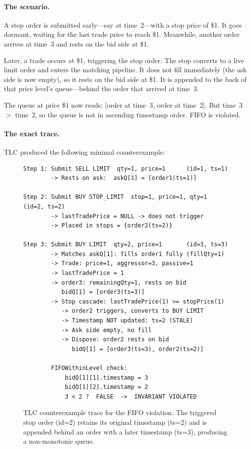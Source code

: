 \documentclass[11pt,a4paper]{article}
\begin{document}
\paragraph{The scenario.} A stop order is submitted early---say at
time~2---with a stop price of \$1. It goes dormant, waiting for the
last trade price to reach \$1. Meanwhile, another order arrives at
time~3 and rests on the bid side at \$1.

Later, a trade occurs at \$1, triggering the stop order. The stop
converts to a live limit order and enters the matching pipeline. It
does not fill immediately (the ask side is now empty), so it rests on
the bid side at \$1. It is appended to the back of that price level's
queue---behind the order that arrived at time~3.

The queue at price \$1 now reads: [order at time~3, order at time~2].
But time~3 $>$ time~2, so the queue is not in ascending timestamp order.
FIFO is violated.

\paragraph{The exact trace.} TLC produced the following minimal
counterexample:

\begin{figure}[H]
\centering
\begin{lstlisting}[language={},basicstyle=\ttfamily\footnotesize,frame=single,xleftmargin=0pt,framexleftmargin=0pt]
Step 1: Submit SELL LIMIT  qty=1, price=1      (id=1, ts=1)
        -> Rests on ask:  askQ[1] = [order1(ts=1)]

Step 2: Submit BUY STOP_LIMIT  stop=1, price=1, qty=1  (id=2, ts=2)
        -> lastTradePrice = NULL -> does not trigger
        -> Placed in stops = {order2(ts=2)}

Step 3: Submit BUY LIMIT  qty=2, price=1       (id=3, ts=3)
        -> Matches askQ[1]: fills order1 fully (fillQty=1)
        -> Trade: price=1, aggressor=3, passive=1
        -> lastTradePrice = 1
        -> order3: remainingQty=1, rests on bid
           bidQ[1] = [order3(ts=3)]
        -> Stop cascade: lastTradePrice(1) >= stopPrice(1)
           -> order2 triggers, converts to BUY LIMIT
           -> Timestamp NOT updated: ts=2 (STALE)
           -> Ask side empty, no fill
           -> Dispose: order2 rests on bid
              bidQ[1] = [order3(ts=3), order2(ts=2)]

        FIFOWithinLevel check:
            bidQ[1][1].timestamp = 3
            bidQ[1][2].timestamp = 2
            3 < 2 ?  FALSE  ->  INVARIANT VIOLATED
\end{lstlisting}
\caption{TLC counterexample trace for the FIFO violation. The triggered
stop order (id=2) retains its original timestamp (ts=2) and is appended
behind an order with a later timestamp (ts=3), producing a
non-monotonic queue.}
\label{fig:trace}
\end{figure}
\end{document}
